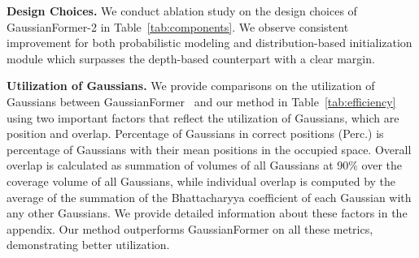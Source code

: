 \textbf{Design Choices.}
We conduct ablation study on the design choices of GaussianFormer-2 in Table~\ref{tab:components}.
We observe consistent improvement for both probabilistic modeling and distribution-based initialization module which surpasses the depth-based counterpart with a clear margin.


\textbf{Utilization of Gaussians.}
We provide comparisons on the utilization of Gaussians between GaussianFormer~\cite{huang2024gaussian} and our method in Table~\ref{tab:efficiency} using two important factors that reflect the utilization of Gaussians, which are position and overlap. 
Percentage of Gaussians in correct positions (Perc.) is percentage of Gaussians with their mean positions in the occupied space.
Overall overlap is calculated as summation of volumes of all Gaussians at 90\% over the coverage volume of all Gaussians, while individual overlap is computed by the average of the summation of the Bhattacharyya coefficient of each Gaussian with any other Gaussians.
We provide detailed information about these factors in the appendix.
Our method outperforms GaussianFormer on all these metrics, demonstrating better utilization.


\begin{table}[t]
    \centering
    \caption{
    \textbf{Ablation on the efficiency of GaussianFormer-2.}
    We set the number of Gaussians to 25600.
    Perc. and Dist. denote the percentage of Gaussians in correct positions, and the average distance of each Gaussian to its nearest occupied voxel, respectively.
    Overall and Indiv. represent the overall and individual overlapping ratios of Gaussians, respectively.
    }
    \vspace{-2mm}
    \setlength{\tabcolsep}{0.01\linewidth}
    \vspace{-7mm}
    \label{tab:efficiency}
\end{table}


